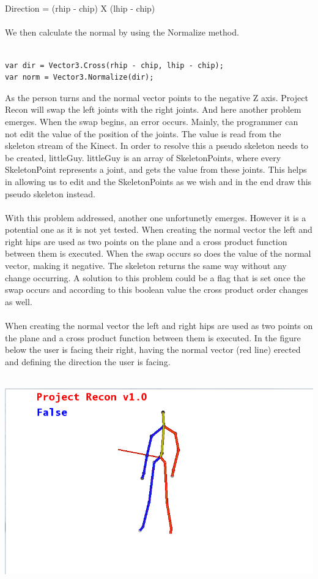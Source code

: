 \\
\\
Direction = (rhip - chip) X (lhip - chip)
\\
\\
We then calculate the normal by using the Normalize method.
\\
\\
\begin{verbatim}
var dir = Vector3.Cross(rhip - chip, lhip - chip);
var norm = Vector3.Normalize(dir);
\end{verbatim}
As the person turns and the normal vector points to the negative Z axis. Project Recon will swap the left joints with the right joints. And here another problem emerges. When the swap begins, an error occurs. Mainly, the programmer can not edit the value of the position of the joints. The value is read from the skeleton stream of the Kinect. In order to resolve this a pseudo skeleton needs to be created, littleGuy. littleGuy is an array of SkeletonPoints, where every SkeletonPoint represents a joint, and gets the value from these joints. This helps in allowing us to edit and the SkeletonPoints as we wish and in the end draw this pseudo skeleton instead.
\\
\\
With this problem addressed, another one unfortunetly emerges. However it is a potential one as it is not yet tested. When creating the normal vector the left and right hips are used as two points on the plane and a cross product function between them is executed. 
When the swap occurs so does the value of the normal vector, making it negative. The skeleton returns the same way without any change occurring. A solution to this problem could be a flag that is set once the swap occurs and according to this boolean value the cross product order changes as well.
\\
\\
When creating the normal vector the left and right hips are used as two points on the plane and a cross product function between them is executed. 
In the figure below the user is facing their right, having the normal vector (red line) erected and defining the direction the user is facing.
\\
\\
\centerline{\includegraphics[scale=0.5]{skeleton_normal.png}}

